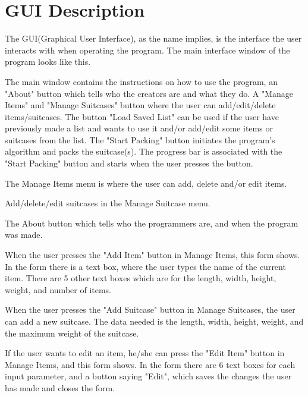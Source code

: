 \section{GUI Description}

The GUI(Graphical User Interface), as the name implies, is the interface the user interacts with when operating the program.
The main interface window of the program looks like this.


The main window contains the instructions on how to use the program, an "About" button which tells who the creators are and what they do. A "Manage Items" and "Manage Suitcases" button where the user can add/edit/delete items/suitcases. The button "Load Saved List" can be used if the user have previously made a list and wants to use it and/or add/edit some items or suitcases from the list. The "Start Packing" button initiates the program's algorithm and packs the suitcase(s). The progress bar is associated with the "Start Packing" button and starts when the user presses the button.

The Manage Items menu is where the user can add, delete and/or edit items.

Add/delete/edit suitcases in the Manage Suitcase menu.

The About button which tells who the programmers are, and when the program was made.

When the user presses the "Add Item" button in Manage Items, this form shows. In the form there is a text box, where the user types the name of the current item. There are 5 other text boxes which are for the length, width, height, weight, and number of items.

When the user presses the "Add Suitcase" button in Manage Suitcases, the user can add a new suitcase. The data needed is the length, width, height, weight, and the maximum weight of the suitcase. 

If the user wants to edit an item, he/she can press the "Edit Item" button in Manage Items, and this form shows. In the form there are 6 text boxes for each input parameter, and a button saying "Edit", which saves the changes the user has made and closes the form.

